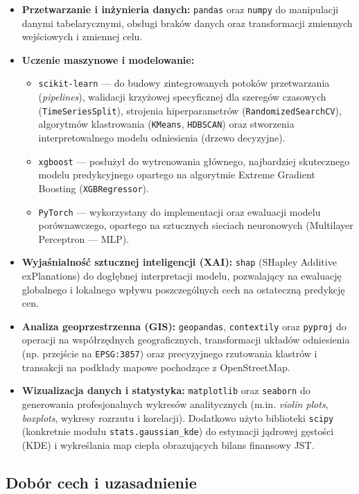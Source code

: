 \documentclass[12pt,a4paper]{article}
\begin{document}
\begin{itemize}
    \item \textbf{Przetwarzanie i inżynieria danych:} \texttt{pandas} oraz \texttt{numpy} do manipulacji danymi tabelarycznymi, obsługi braków danych oraz transformacji zmiennych wejściowych i zmiennej celu.
    \item \textbf{Uczenie maszynowe i modelowanie:}
    \begin{itemize}
        \item \texttt{scikit-learn} --- do budowy zintegrowanych potoków przetwarzania (\textit{pipelines}), walidacji krzyżowej specyficznej dla szeregów czasowych (\texttt{TimeSeriesSplit}), strojenia hiperparametrów (\texttt{RandomizedSearchCV}), algorytmów klastrowania (\texttt{KMeans}, \texttt{HDBSCAN}) oraz stworzenia interpretowalnego modelu odniesienia (drzewo decyzyjne).
        \item \texttt{xgboost} --- posłużył do wytrenowania głównego, najbardziej skutecznego modelu predykcyjnego opartego na algorytmie Extreme Gradient Boosting (\texttt{XGBRegressor}).
        \item \texttt{PyTorch} --- wykorzystany do implementacji oraz ewaluacji modelu porównawczego, opartego na sztucznych sieciach neuronowych (Multilayer Perceptron --- MLP).
    \end{itemize}
    \item \textbf{Wyjaśnialność sztucznej inteligencji (XAI):} \texttt{shap} (SHapley Additive exPlanations) do dogłębnej interpretacji modelu, pozwalający na ewaluację globalnego i lokalnego wpływu poszczególnych cech na ostateczną predykcję cen.
    \item \textbf{Analiza geoprzestrzenna (GIS):} \texttt{geopandas}, \texttt{contextily} oraz \texttt{pyproj} do operacji na współrzędnych geograficznych, transformacji układów odniesienia (np. przejście na \texttt{EPSG:3857}) oraz precyzyjnego rzutowania klastrów i transakcji na podkłady mapowe pochodzące z OpenStreetMap.
    \item \textbf{Wizualizacja danych i statystyka:} \texttt{matplotlib} oraz \texttt{seaborn} do generowania profesjonalnych wykresów analitycznych (m.in. \textit{violin plots}, \textit{boxplots}, wykresy rozrzutu i korelacji). Dodatkowo użyto biblioteki \texttt{scipy} (konkretnie modułu \texttt{stats.gaussian\_kde}) do estymacji jądrowej gęstości (KDE) i wykreślania map ciepła obrazujących bilans finansowy JST.
\end{itemize}

\subsection{Dobór cech i uzasadnienie}
\end{document}
